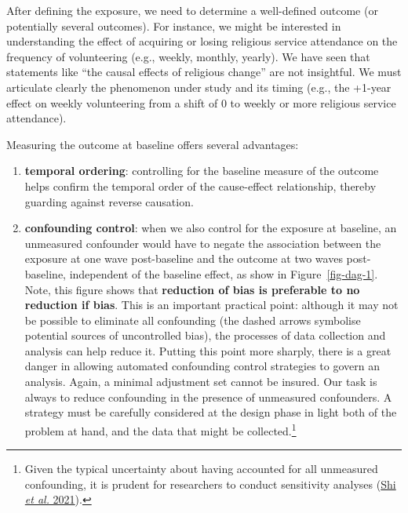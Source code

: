\documentclass[
  singlecolumn]{article}
\begin{document}
After defining the exposure, we need to determine a well-defined outcome
(or potentially several outcomes). For instance, we might be interested
in understanding the effect of acquiring or losing religious service
attendance on the frequency of volunteering (e.g., weekly, monthly,
yearly). We have seen that statements like ``the causal effects of
religious change'' are not insightful. We must articulate clearly the
phenomenon under study and its timing (e.g., the +1-year effect on
weekly volunteering from a shift of 0 to weekly or more religious
service attendance).

Measuring the outcome at baseline offers several advantages:

\begin{enumerate}
\def\labelenumi{\alph{enumi}.}
\item
  \textbf{temporal ordering}: controlling for the baseline measure of
  the outcome helps confirm the temporal order of the cause-effect
  relationship, thereby guarding against reverse causation.
\item
  \textbf{confounding control}: when we also control for the exposure at
  baseline, an unmeasured confounder would have to negate the
  association between the exposure at one wave post-baseline and the
  outcome at two waves post-baseline, independent of the baseline
  effect, as show in Figure~\ref{fig-dag-1}. Note, this figure shows
  that \textbf{reduction of bias is preferable to no reduction if bias}.
  This is an important practical point: although it may not be possible
  to eliminate all confounding (the dashed arrows symbolise potential
  sources of uncontrolled bias), the processes of data collection and
  analysis can help reduce it. Putting this point more sharply, there is
  a great danger in allowing automated confounding control strategies to
  govern an analysis. Again, a minimal adjustment set cannot be insured.
  Our task is always to reduce confounding in the presence of unmeasured
  confounders. A strategy must be carefully considered at the design
  phase in light both of the problem at hand, and the data that might be
  collected.\footnote{Given the typical uncertainty about having
    accounted for all unmeasured confounding, it is prudent for
    researchers to conduct sensitivity analyses
    (\protect\hyperlink{ref-shi2021}{Shi \emph{et al.} 2021}).}
\end{enumerate}
\end{document}
